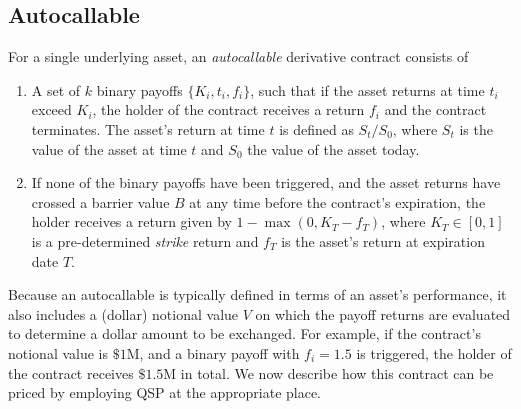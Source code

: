 \documentclass{article}
\begin{document}
\subsection{Autocallable}
\label{sec:autocallable}
For a single underlying asset, an \emph{autocallable} derivative contract consists of

\begin{enumerate}
    \item A set of $k$ binary payoffs $\{K_i, t_i, f_i \}$, such that if the asset returns at time $t_i$ exceed $K_i$, the holder of the contract receives a return $f_i$ and the contract terminates. The asset's return at time $t$ is defined as $S_t/S_0$, where $S_t$ is the value of the asset at time $t$ and $S_0$ the value of the asset today.
    \item If none of the binary payoffs have been triggered, and the asset returns have crossed a barrier value $B$ at any time before the contract's expiration, the holder receives a return given by $1-\max(0, K_T - f_T)$, where $K_T \in [0,1]$ is a pre-determined \emph{strike} return and $f_T$ is the asset's return at expiration date $T$.
\end{enumerate}
Because an autocallable is typically defined in terms of an asset's performance, it also includes a (dollar) notional value $V$ on which the payoff returns are evaluated to determine a dollar amount to be exchanged.
For example, if the contract's notional value is $\$1$M, and a binary payoff with $f_i = 1.5$ is triggered, the holder of the contract receives $\$1.5$M in total.
We now describe how this contract can be priced by employing QSP at the appropriate place.
\end{document}
